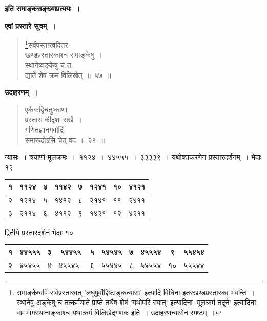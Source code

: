 \documentclass[11pt, openany]{book}
\begin{document}
\begin{center}
\textbf{इति समाङ्कसङ्ख्याप्रत्ययः~।}
\end{center}
\vspace{2mm}

\textbf{एषां प्रस्तारे सूत्रम्~।}

\begin{quote}
\renewcommand{\thefootnote}{१}\footnote{समाङ्केष्वपि सर्वप्रस्तारवत् \hyperref[13.49]{'लघुपूर्वोद्दिष्टाङ्कन्यासः'} इत्यादि विधिना इतरखण्डप्रस्तारका भवन्ति~। स्थानेषु अङ्केषु च तत्कर्मयाते प्राप्ते तथैव शेषं \hyperref[13.49]{'यथोपरि स्यात्'} इत्यादिना \hyperref[13.49]{'मूलक्रमं तदूने'} इत्यादिना वामभागस्थानाङ्काश्च यथाक्रमं विलिखेद्गणक इति~। उदाहरणन्यासेन स्पष्टम्~।}{\gk सर्वप्रस्तारवदितर-\\
खण्डप्रस्तारकाश्च समाङ्केषु~।\\
स्थानेष्वङ्केषु च त-\\
द्याते शेषं क्रमं विलिखेत्~॥~५७~॥}
\end{quote}

\newpage

\textbf{उदाहरणम्~।}

\begin{quote}
{\ex एकैकद्विचतुष्काणां\\
प्रस्तारः कीदृशः सखे~।\\
गणितज्ञानगर्वाद्रिं\\
समारूढोऽसि चेत् वद~॥~२१~॥}
\end{quote}

न्यासः~। त्रयाणां मूलक्रमः~।~११२४~।~४४५५५~।~३३३३९~। यथोक्तकरणेन प्रस्तारदर्शनम्~। भेदाः १२

\begin{table}[h]
	\centering
\begin{tabular}{|c|c|c|c|c|c|c|c|}
\hline
{\hbox{१}} & {\hbox{११२४}}	 & {\hbox{४}} & {\hbox{११४२}} & {\hbox{७}} & {\hbox{१२४१}} & {\hbox{१०}} & {\hbox{४१२१}}\\ 
\hline
{\hbox{२}} & {\hbox{१२१४}}	 & {\hbox{५}} & {\hbox{१४१२}} & {\hbox{८}} & {\hbox{२१४१}} & {\hbox{११}} & {\hbox{२४११}}\\
\hline 
{\hbox{३}} & {\hbox{२११४}}	 & {\hbox{६}} & {\hbox{४११२}} & {\hbox{९}} & {\hbox{१४२१}} & {\hbox{१२}} & {\hbox{४२११}}\\
\hline 
\end{tabular}
\end{table}

द्वितीये प्रस्तारदर्शनं भेदाः १०

\begin{table}[h]
	\centering
	\begin{tabular}{|c|c|c|c|c|c|c|c|c|c|}
		\hline
		{\hbox{१}} & {\hbox{४४५५५}}	 & {\hbox{३}} & {\hbox{५४४५५}} & {\hbox{५}} & {\hbox{५४५४५}} & {\hbox{७}} & {\hbox{४५५५४}}   & {\hbox{९}} & {\hbox{५५४५४}} \\ 
		\hline
		{\hbox{२}} & {\hbox{४५४५५}}	 & {\hbox{४}} & {\hbox{४५५४५ }} & {\hbox{६}} & {\hbox{५५४४५}} & {\hbox{८}} & {\hbox{५४५५४}} & {\hbox{१०}}  & {\hbox{५५५४४}}\\
\hline 
\end{tabular}
\end{table}
\end{document}
